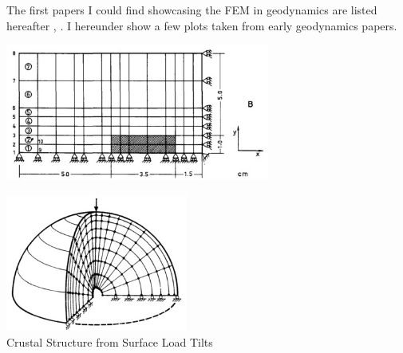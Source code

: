 
The first papers I could find showcasing the FEM in geodynamics are listed hereafter
\cite{gart78}, 
\cite{anbr80}\cite{mera80}\cite{bran80}
\cite{engl82}
\cite{thar85}\cite{scan85}
\cite{enho86}\cite{mofr86}
\cite{zupa86}
\cite{boww89}
\cite{brau94}
\cite{brbe95}.
I hereunder show a few plots taken from early geodynamics papers.


\begin{center}
\includegraphics[height=4.5cm]{images/history/stbe71}\\
\cite{stbe71}
\end{center}

\begin{center}
\centering
\includegraphics[height=4.5cm]{images/history/bela72}\\
{\captionfont Crustal Structure from Surface Load Tilts \cite{bela72}}
\end{center}

